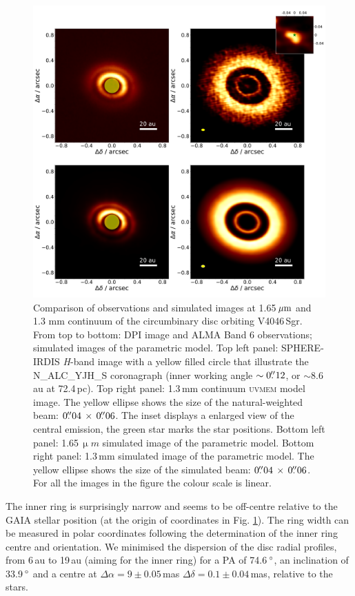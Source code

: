 \documentclass[letters,usenatbib,times]{mnras}
\begin{document}
\begin{figure}
  \includegraphics[width=\textwidth]{hot_two_E.pdf}
  \caption{Comparison of observations and simulated images at 1.65\,$\hbox{$\mu$m}$ and 1.3 mm continuum of the circumbinary disc orbiting V4046\,Sgr. From top to bottom: DPI image and ALMA Band 6 observations; simulated images of the parametric model. Top left panel: SPHERE-IRDIS \textit{H}-band image with a yellow filled circle that illustrate the N\_ALC\_YJH\_S coronagraph (inner working angle $\sim0\hbox{$.\!\!^{\prime\prime}$}12$, or $\sim$8.6\,au at 72.4\,pc). Top right panel: 1.3\,mm continuum \textsc{uvmem} model image. The yellow ellipse shows the size of the natural-weighted beam: $ 0\hbox{$.\!\!^{\prime\prime}$}04 \, \times \, 0\hbox{$.\!\!^{\prime\prime}$}06$. The inset displays a enlarged view of the central emission, the green star marks the star positions. Bottom left panel: 1.65\,$\upmu m$ simulated image of the parametric model. Bottom right panel: 1.3\,mm simulated image of the parametric model. The yellow ellipse shows the size of the simulated beam: $ 0\hbox{$.\!\!^{\prime\prime}$}04 \, \times \, 0\hbox{$.\!\!^{\prime\prime}$}06$. For all the images in the figure the colour scale is linear.}
  \label{fig:two}
\end{figure}

The inner ring is surprisingly narrow and seems to be off-centre relative to the GAIA stellar position (at the origin of coordinates in Fig. \ref{fig:two}). The ring width can be measured in polar coordinates following the determination of the inner ring centre and orientation. We minimised the dispersion of the disc radial profiles, from 6\,au to 19\,au (aiming for the inner ring) for a PA of 74.6\,$\hbox{$^\circ$}$, an inclination of 33.9\,$\hbox{$^\circ$}$ and a centre at $\Delta \alpha = 9\pm0.05$\,mas $\Delta \delta = 0.1\pm0.04$\,mas, relative to the stars.
\end{document}
